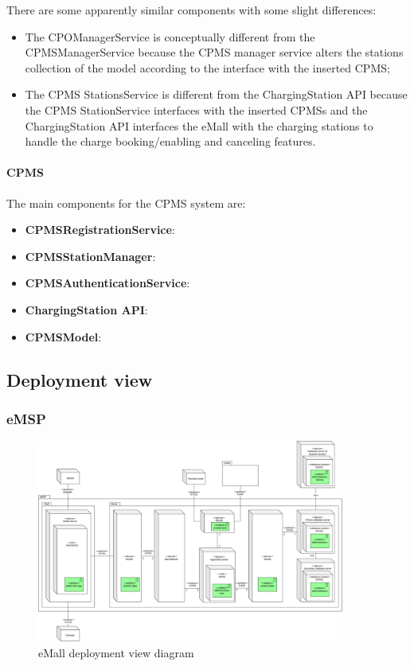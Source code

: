 There are some apparently similar components with some slight differences:
\begin{itemize}
    \item The \ac{CPO}ManagerService is conceptually different from the \ac{CPMS}ManagerService because the CPMS manager service alters the stations collection of the model according to the interface with the inserted \ac{CPMS};
    \item The \ac{CPMS} StationsService is different from the ChargingStation \ac{API} because the \ac{CPMS} StationService interfaces with the inserted \acp{CPMS} and the ChargingStation \ac{API} interfaces the \ac{eMall} with the charging stations to handle the charge booking/enabling and canceling features.
\end{itemize}
\paragraph{\textbf{\ac{CPMS}}}
The main components for the \ac{CPMS} system are:
\begin{itemize}
    \item \textbf{\ac{CPMS}RegistrationService}:
    \item \textbf{\ac{CPMS}StationManager}:
    \item \textbf{\ac{CPMS}AuthenticationService}:
    \item \textbf{ChargingStation \ac{API}}:
    \item \textbf{\ac{CPMS}Model}:
\end{itemize}

\subsection{Deployment view}
\subsubsection{\ac{eMSP}}
\begin{figure}[!h]
    \begin{center}
        \includegraphics[keepaspectratio, width=0.9\textwidth]{Graphics/DD-eMSP-deployment.drawio.png}
        \caption{eMall deployment view diagram}
        \label{fig:eMSP-deployment}
    \end{center}
\end{figure}

